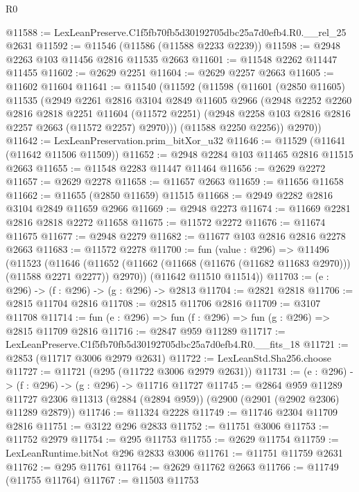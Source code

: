 \begin{lexlean}{R0}
\begin{coremodule}
@11588 := LexLeanPreserve.C1f5fb70fb5d30192705dbc25a7d0efb4.R0.__rel_25 @2631
@11592 := @11546 (@11586 (@11588 @2233 @2239))
@11598 := @2948 @2263 @103 @11456 @2816 @11535 @2663
@11601 := @11548 @2262 @11447 @11455
@11602 := @2629 @2251
@11604 := @2629 @2257 @2663
@11605 := @11602 @11604
@11641 := @11540
    (@11592
      (@11598
        (@11601
          (@2850 @11605)
          @11535
          (@2949
            @2261
            @2816
            @3104
            @2849
            @11605
            @2966
            (@2948
              @2252
              @2260
              @2816
              @2818
              @2251
              @11604
              (@11572 @2251)
              (@2948 @2258 @103 @2816 @2816 @2257 @2663 (@11572 @2257) @2970)))
          (@11588 @2250 @2256))
        @2970))
@11642 := LexLeanPreservation.prim_bitXor_u32
@11646 := @11529 (@11641 (@11642 @11506 @11509))
@11652 := @2948 @2284 @103 @11465 @2816 @11515 @2663
@11655 := @11548 @2283 @11447 @11464
@11656 := @2629 @2272
@11657 := @2629 @2278
@11658 := @11657 @2663
@11659 := @11656 @11658
@11662 := @11655 (@2850 @11659) @11515
@11668 := @2949 @2282 @2816 @3104 @2849 @11659 @2966
@11669 := @2948 @2273
@11674 := @11669 @2281 @2816 @2818 @2272 @11658
@11675 := @11572 @2272
@11676 := @11674 @11675
@11677 := @2948 @2279
@11682 := @11677 @103 @2816 @2816 @2278 @2663
@11683 := @11572 @2278
@11700 := fun (value : @296) =>
  @11496
    (@11523
      (@11646 (@11652 (@11662 (@11668 (@11676 (@11682 @11683 @2970))) (@11588 @2271 @2277)) @2970))
      (@11642 @11510 @11514))
@11703 := (e : @296) -> (f : @296) -> (g : @296) -> @2813
@11704 := @2821 @2818
@11706 := @2815 @11704 @2816
@11708 := @2815 @11706 @2816
@11709 := @3107 @11708
@11714 := fun (e : @296) => fun (f : @296) => fun (g : @296) => @2815 @11709 @2816
@11716 := @2847 @959 @11289
@11717 := LexLeanPreserve.C1f5fb70fb5d30192705dbc25a7d0efb4.R0.__fits_18
@11721 := @2853 (@11717 @3006 @2979 @2631)
@11722 := LexLeanStd.Sha256.choose
@11727 := @11721 (@295 (@11722 @3006 @2979 @2631))
@11731 := (e : @296) -> (f : @296) -> (g : @296) -> @11716 @11727
@11745 := @2864
    @959
    @11289
    @11727
    @2306
    @11313
    (@2884 (@2894 @959))
    (@2900 (@2901 (@2902 @2306) @11289 @2879))
@11746 := @11324 @2228
@11749 := @11746 @2304 @11709 @2816
@11751 := @3122 @296 @2833
@11752 := @11751 @3006
@11753 := @11752 @2979
@11754 := @295 @11753
@11755 := @2629 @11754
@11759 := LexLeanRuntime.bitNot @296 @2833 @3006
@11761 := @11751 @11759 @2631
@11762 := @295 @11761
@11764 := @2629 @11762 @2663
@11766 := @11749 (@11755 @11764)
@11767 := @11503 @11753

\end{coremodule}
\end{lexlean}
